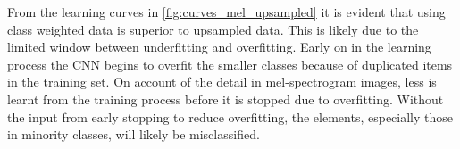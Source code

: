 \documentclass[conference]{IEEEtran}
\begin{document}

From the learning curves in \autoref{fig:curves_mel_upsampled} it is evident that using class weighted data is superior to upsampled data. This is likely due to the limited window between underfitting and overfitting. Early on in the learning process the CNN begins to overfit the smaller classes because of duplicated items in the training set. On account of the detail in mel-spectrogram images, less is learnt from the training process before it is stopped due to overfitting. Without the input from early stopping to reduce overfitting, the elements, especially those in minority classes, will likely be misclassified. 

\end{document}
